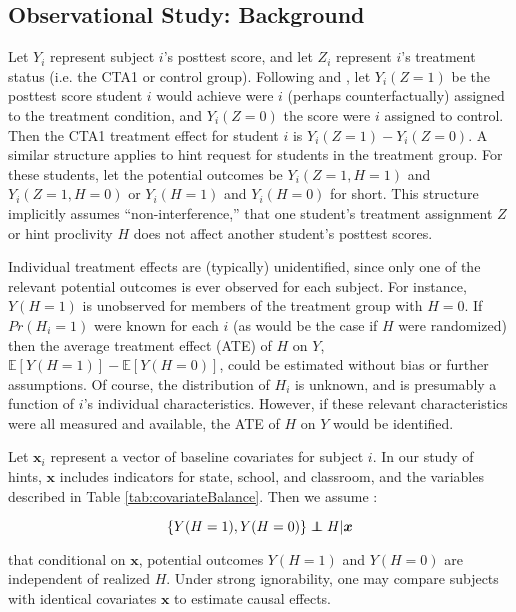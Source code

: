 \documentclass{article}\usepackage[]{graphicx}\usepackage[]{color}
\newcommand{\EE}{\mathbb{E}}
\newenvironment{ass}[2][Assumption:]{\begin{trivlist}
\item[\hskip \labelsep {\bfseries #1}\hskip \labelsep {\bfseries #2}.]}{\end{trivlist}}
\def\independenT#1#2{\mathrel{\rlap{$#1#2$}\mkern2mu{#1#2}}}
\newcommand\independent{\protect\mathpalette{\protect\independenT}{\perp}}
\begin{document}
\subsection{Observational Study: Background}
Let $Y_i$ represent subject $i$'s posttest score, and let $Z_i$ represent
$i$'s treatment status (i.e. the CTA1 or control group).
Following \citet{neyman} and \citet{rubin}, let $Y_i(Z=1)$ be
the posttest score student $i$ would achieve were $i$ (perhaps
counterfactually) assigned to the treatment condition, and
$Y_i(Z=0)$ the score were $i$ assigned to control.
Then the CTA1 treatment effect for student $i$ is $Y_i(Z=1)-Y_i(Z=0)$.
A similar structure applies to hint request for students in the
treatment group.
For these students, let the potential outcomes be $Y_i(Z=1,H=1)$ and
$Y_i(Z=1,H=0)$ or $Y_i(H=1)$ and $Y_i(H=0)$ for short.
This structure implicitly assumes ``non-interference,'' that one
student's treatment assignment $Z$ or hint proclivity $H$ does not
affect another student's posttest scores.

Individual treatment effects are (typically) unidentified, since only
one of the relevant potential outcomes is ever observed for each
subject.
For instance, $Y(H=1)$ is unobserved for members of the
treatment group with $H=0$.
If $Pr(H_i=1)$ were known for each $i$ (as would be the case if $H$
were randomized) then the average treatment effect (ATE) of $H$ on $Y$,
$\EE[Y(H=1)]-\EE[Y(H=0)]$, could be estimated without bias or further
assumptions.
Of course, the distribution of $H_i$ is unknown, and is presumably a
function of $i$'s individual characteristics.
However, if these relevant characteristics were all measured and
available, the ATE of $H$ on $Y$ would be identified.

Let $\bm{x}_i$ represent a vector of baseline covariates for subject $i$.
In our study of hints, $\bm{x}$ includes indicators for state, school,
and classroom, and the variables described in Table \ref{tab:covariateBalance}.
Then we assume \citep[c.f.][]{rosenbaum1983central}:
\begin{ass}{Strong Ignorability}
\begin{equation*}
 \{Y(H=1),Y(H=0)\}\independent H |\bm{x}
\end{equation*}
\end{ass}
that conditional on $\bm{x}$, potential outcomes $Y(H=1)$ and $Y(H=0)$
are independent of realized $H$.
Under strong ignorability, one may compare subjects with identical
covariates $\bm{x}$ to estimate causal effects.
\end{document}
